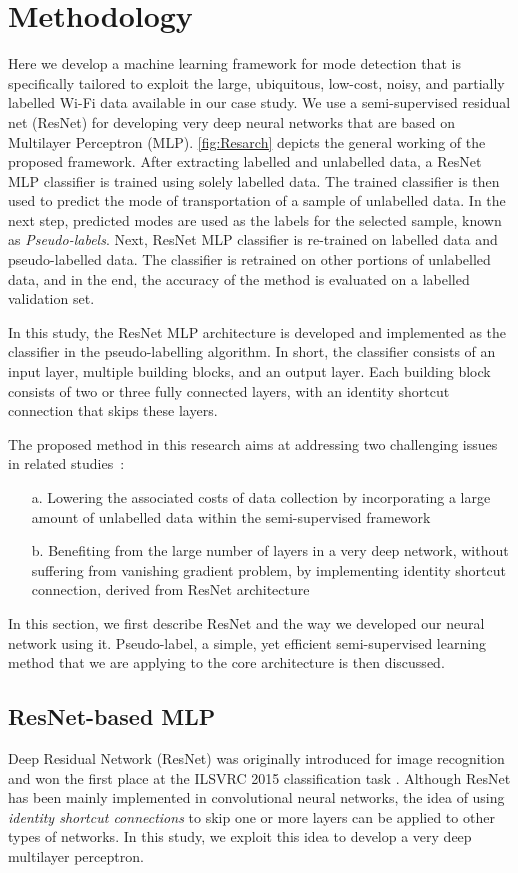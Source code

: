 \section{Methodology}
\label{S:w3}
Here we develop a machine learning framework for mode detection that is specifically tailored to exploit the large, ubiquitous, low-cost, noisy, and partially labelled Wi-Fi data available in our case study. We use a semi-supervised residual net (ResNet) for developing very deep neural networks that are based on Multilayer Perceptron (MLP). \cref{fig:Resarch} depicts the general working of the proposed framework. After extracting labelled and unlabelled data, a ResNet MLP classifier is trained using solely labelled data. The trained classifier is then used to predict the mode of transportation of a sample of unlabelled data. In the next step, predicted modes are used as the labels for the selected sample, known as \textit{Pseudo-labels}. Next, ResNet MLP classifier is re-trained on labelled data and pseudo-labelled data. The classifier is retrained on other portions of unlabelled data, and in the end, the accuracy of the method is evaluated on a labelled validation set.

In this study, the ResNet MLP architecture is developed and implemented as the classifier in the pseudo-labelling algorithm. In short, the classifier consists of an input layer, multiple building blocks, and an output layer. Each building block consists of two or three fully connected layers, with an identity shortcut connection that skips these layers.  

The proposed method in this research aims at addressing two challenging issues in related studies~\cite{he2016deep,lee2013pseudo}:
\begin{enumerate}
    \item[a.] Lowering the associated costs of data collection by incorporating a large amount of unlabelled data within the semi-supervised framework
    \item[b.] Benefiting from the large number of layers in a very deep network, without suffering from vanishing gradient problem, by implementing identity shortcut connection, derived from ResNet architecture
\end{enumerate}
In this section, we first describe ResNet and the way we developed our neural network using it. Pseudo-label, a simple, yet efficient semi-supervised learning method that we are applying to the core architecture is then discussed.

\subsection{ResNet-based MLP}
Deep Residual Network (ResNet) was originally introduced for image recognition and won the first place at the ILSVRC 2015 classification task \cite{he2016deep}. Although ResNet has been mainly implemented in convolutional neural networks, the idea of using \textit{identity shortcut connections} to skip one or more layers can be applied to other types of networks. In this study, we exploit this idea to develop a very deep multilayer perceptron.

